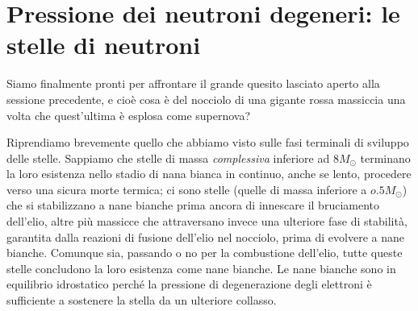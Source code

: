 \section{Pressione dei neutroni degeneri: le stelle di neutroni}\label{stelle neutroni}
Siamo finalmente pronti per affrontare il grande quesito lasciato aperto alla sessione precedente, e cioè cosa è del nocciolo di una gigante rossa massiccia una volta che quest'ultima è esplosa come supernova? 
\par
Riprendiamo brevemente quello che abbiamo visto sulle fasi terminali di sviluppo delle stelle.
Sappiamo che stelle di massa \emph{complessiva} inferiore ad $8M_{\odot}$ terminano la loro esistenza nello stadio di nana bianca in continuo, anche se lento, procedere verso una sicura morte termica; ci sono stelle (quelle di massa inferiore a $o.5 M_{\odot}$) che si stabilizzano a nane bianche prima ancora di innescare il bruciamento dell'elio, altre più massicce che attraversano invece una ulteriore fase di stabilit\`{a}, garantita dalla reazioni di fusione dell'elio nel nocciolo, prima di evolvere a nane bianche. Comunque sia, passando o no per la combustione dell'elio, tutte queste stelle concludono la loro esistenza come nane bianche. Le nane bianche sono in equilibrio idrostatico perch\'{e} la pressione di degenerazione degli elettroni è sufficiente a sostenere la stella da un ulteriore collasso.
\par
